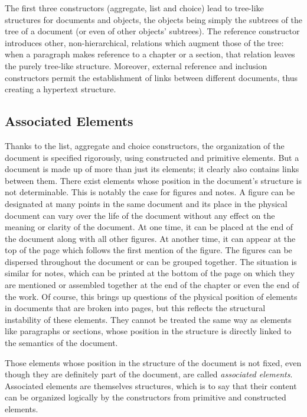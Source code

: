 The first three constructors (aggregate, list and choice) lead to
tree-like structures for documents and objects, the objects being
simply the subtrees of the tree of a document (or even of other
objects' subtrees).  The reference constructor introduces other,
non-hierarchical, relations which augment those of the tree: when a
paragraph makes reference to a chapter or a section, that relation
leaves the purely tree-like structure.  Moreover,  external reference and
inclusion constructors permit the establishment of links between different
documents, thus creating a hypertext structure.

\subsection{Associated Elements}
\label{elemassoc}

Thanks to the list, aggregate and choice constructors, the organization of the
document is specified rigorously, using constructed and primitive
elements.  But a document is made up of more than just its elements;
it clearly also contains links between them.  There exist elements
whose position in the document's structure is not determinable.  This
is notably the case for figures and notes.  A figure can be designated
at many points in the same document and its place in the physical
document can vary over the life of the document without any effect on
the meaning or clarity of the document.  At one time, it can be placed
at the end of the document along with all other figures.  At another
time, it can appear at the top of the page which follows the first
mention of the figure.  The figures can be dispersed throughout the
document or can be grouped together.  The situation is similar for
notes, which can be printed at the bottom of the page on which they
are mentioned or assembled together at the end of the chapter or even
the end of the work.  Of course, this brings up questions of the
physical position of elements in documents that are broken into pages,
but this reflects the structural instability of these elements.  They
cannot be treated the same way as elements like paragraphs or
sections, whose position in the structure is directly linked to the
semantics of the document.

Those elements whose position in the structure of the document is not
fixed, even though they are definitely part of the document, are
called {\em associated elements}.  Associated elements are themselves
structures, which is to say that their content can be organized
logically by the constructors from primitive and constructed elements.

